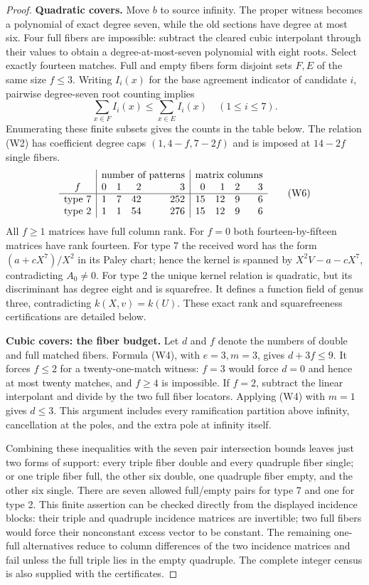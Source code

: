 \begin{proof}
\smallskip\noindent\textbf{Quadratic covers.}
Move $b$ to source infinity.  The proper witness becomes a polynomial
of exact degree seven, while the old sections have degree at most six.
Four full fibers are impossible: subtract the cleared cubic interpolant
through their values to obtain a degree-at-most-seven polynomial with
eight roots.  Select exactly fourteen matches.  Full and empty fibers
form disjoint sets $F,E$ of the same size $f\le3$.
Writing $I_i(x)$ for the base agreement indicator of candidate $i$,
pairwise degree-seven root counting implies
\[
 \sum_{x\in F}I_i(x)\le\sum_{x\in E}I_i(x)
 \quad(1\le i\le7).                                  \tag{W5}
\]
Enumerating these finite subsets gives the counts in the table below.
The relation (W2) has coefficient degree caps $(1,4-f,7-2f)$ and is
imposed at $14-2f$ single fibers.
\[
\begin{array}{c|rrrr|rrrr}
 &\multicolumn{4}{c|}{\text{number of patterns}}&
   \multicolumn{4}{c}{\text{matrix columns}}\\
 f&0&1&2&3&0&1&2&3\\\hline
 \text{type 7}&1&7&42&252&15&12&9&6\\
 \text{type 2}&1&1&54&276&15&12&9&6
\end{array}                                             \tag{W6}
\]
All $f\ge1$ matrices have full column rank.  For $f=0$ both
fourteen-by-fifteen matrices have rank fourteen.  For type 7 the
received word has the form $(a+cX^7)/X^2$ in its Paley chart; hence the
kernel is spanned by $X^2V-a-cX^7$, contradicting $A_0\ne0$.
For type 2 the unique kernel relation is quadratic, but its discriminant
has degree eight and is squarefree.  It defines a function field of
genus three, contradicting $k(X,v)=k(U)$.  These exact rank and
squarefreeness certifications are detailed below.

\smallskip\noindent\textbf{Cubic covers: the fiber budget.}
Let $d$ and $f$ denote the numbers of double and full matched fibers.
Formula (W4), with $e=3,m=3$, gives $d+3f\le9$.
It forces $f\le2$ for a twenty-one-match witness: $f=3$ would force
$d=0$ and hence at most twenty matches, and $f\ge4$ is impossible.
If $f=2$, subtract the linear interpolant and divide by the two full
fiber locators.  Applying (W4) with $m=1$ gives $d\le3$.
This argument includes every ramification partition above infinity,
cancellation at the poles, and the extra pole at infinity itself.

Combining these inequalities with the seven pair intersection bounds
leaves just two forms of support: every triple fiber double and every
quadruple fiber single; or one triple fiber full, the other six double,
one quadruple fiber empty, and the other six single.  There are seven
allowed full/empty pairs for type 7 and one for type 2.
This finite assertion can be checked directly from the displayed
incidence blocks: their triple and quadruple incidence matrices are
invertible; two full fibers would force their nonconstant excess
vector to be constant.  The remaining one-full alternatives reduce to
column differences of the two incidence matrices and fail unless the
full triple lies in the empty quadruple.  The complete integer census
is also supplied with the certificates.


\end{proof}

